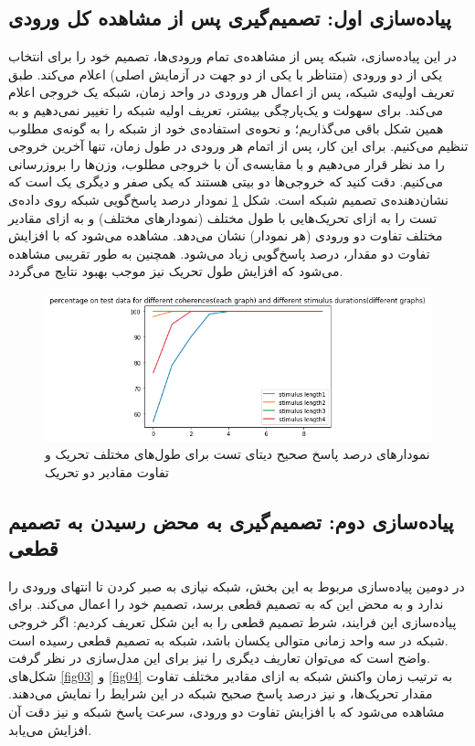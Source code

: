 \documentclass[a4paper]{article}
\begin{document}
\subsection{پیاده‌سازی اول: تصمیم‌گیری پس از مشاهده کل ورودی}
در این پیاده‌سازی،‌ شبکه پس از مشاهده‌ی تمام ورودی‌ها، تصمیم خود را برای انتخاب یکی از دو ورودی (متناظر با یکی از دو جهت در آزمایش اصلی) اعلام می‌کند. طبق تعریف اولیه‌ی شبکه، پس از اعمال هر ورودی در واحد زمان، شبکه یک خروجی اعلام می‌کند. برای سهولت و یک‌پارچگی بیشتر، تعریف اولیه شبکه را تغییر نمی‌دهیم و به همین شکل باقی می‌گذاریم؛ و نحوه‌ی استفاده‌ی خود از شبکه را به گونه‌ی مطلوب تنظیم می‌کنیم. برای این کار، پس از اتمام هر ورودی در طول زمان، تنها آخرین خروجی را مد نظر قرار می‌دهیم و با مقایسه‌ی آن با خروجی مطلوب، وزن‌ها را بروزرسانی می‌کنیم. دقت کنید که خروجی‌ها دو بیتی هستند که یکی صفر و دیگری یک است که نشان‌دهنده‌ی تصمیم شبکه است. شکل \ref{fig01} نمودار درصد پاسخ‌گویی شبکه روی داده‌ی تست را به ازای تحریک‌هایی با طول مختلف (نمودارهای مختلف) و به ازای مقادیر مختلف تفاوت دو ورودی (هر نمودار) نشان می‌دهد. مشاهده می‌شود که با افزایش تفاوت دو مقدار، درصد پاسخ‌گویی زیاد می‌شود. همچنین به طور تقریبی مشاهده می‌شود که افزایش طول تحریک نیز موجب بهبود نتایج می‌گردد.
\begin{figure}[h!]
	\centering
	\includegraphics[scale=0.7]{fig01.png}
	\caption{نمودارهای درصد پاسخ صحیح دیتای تست برای طول‌های مختلف تحریک و تفاوت مقادیر دو تحریک}
	\label{fig01}
\end{figure}

\subsection{پیاده‌سازی دوم: تصمیم‌گیری به محض رسیدن به تصمیم قطعی}
در دومین پیاده‌سازی مربوط به این بخش، شبکه نیازی به صبر کردن تا انتهای ورودی را ندارد و به محض این که به تصمیم قطعی برسد، تصمیم خود را اعمال می‌کند. برای پیاده‌سازی این فرایند، شرط تصمیم قطعی را به این شکل تعریف کردیم: اگر خروجی شبکه در سه واحد زمانی متوالی یکسان باشد، شبکه به تصمیم قطعی رسیده است.\\
واضح است که می‌توان تعاریف دیگری را نیز برای این مدل‌سازی در نظر گرفت.\\
شکل‌های \ref{fig03} و \ref{fig04} به ترتیب زمان واکنش شبکه به ازای مقادیر مختلف تفاوت مقدار تحریک‌ها، و نیز درصد پاسخ صحیح شبکه در این شرایط را نمایش می‌دهند. مشاهده می‌شود که با افزایش تفاوت دو ورودی، سرعت پاسخ شبکه و نیز دقت آن افزایش می‌یابد.
\end{document}
